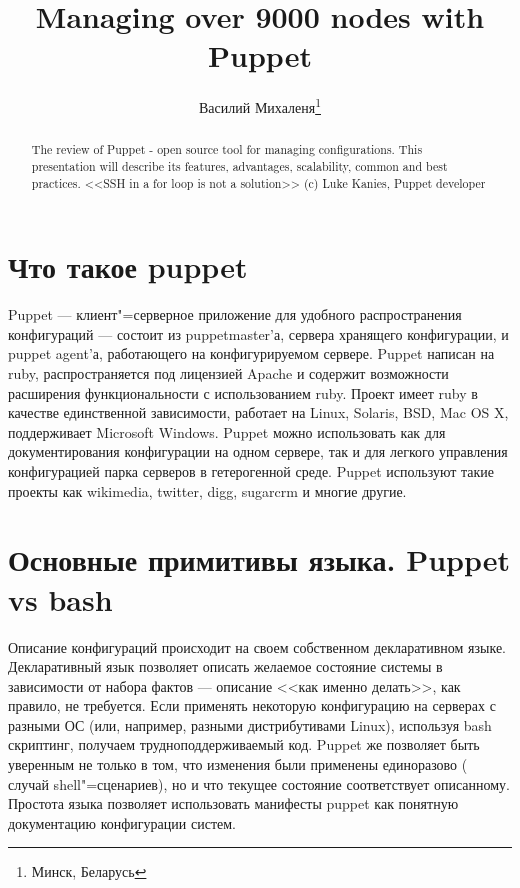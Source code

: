 \documentclass[10pt, a5paper]{article}
\begin{document}
\title{Managing over 9000 nodes with Puppet}%

\author{Василий Михаленя\footnote{Минск, Беларусь}}
\maketitle

\begin{abstract}
The review of Puppet - open source tool for managing configurations. This presentation will describe its features, advantages, scalability, common and best practices. <<SSH in a for loop is not a solution>> (c) Luke Kanies, Puppet developer
\end{abstract}

\section*{Что такое puppet}

Puppet --- клиент"=серверное приложение для удобного распространения конфигураций --- состоит из puppetmaster'а, сервера хранящего конфигурации, и puppet agent'а, работающего на конфигурируемом сервере. Puppet написан на ruby, распространяется под лицензией Apache и содержит возможности расширения функциональности с использованием ruby. Проект имеет ruby в качестве единственной зависимости, работает на Linux, Solaris, BSD, Mac OS X, поддерживает Microsoft Windows. Puppet можно использовать как для документирования конфигурации на одном сервере, так и для легкого управления конфигурацией парка серверов в гетерогенной среде. Puppet используют такие проекты как wikimedia, twitter, digg, sugarcrm и многие другие.

\section*{Основные примитивы языка. Puppet vs bash}

Описание конфигураций происходит на своем собственном декларативном языке. Декларативный язык позволяет описать желаемое состояние системы в зависимости от набора фактов --- описание <<как именно делать>>, как правило, не требуется. Если применять некоторую конфигурацию на серверах с разными ОС (или, например, разными дистрибутивами Linux), используя bash скриптинг, получаем трудноподдерживаемый код. Puppet же позволяет быть уверенным не только в том, что изменения были применены единоразово ( случай shell"=сценариев), но и что текущее состояние соответствует описанному. Простота языка позволяет использовать манифесты puppet как понятную документацию конфигурации систем.
\end{document}
